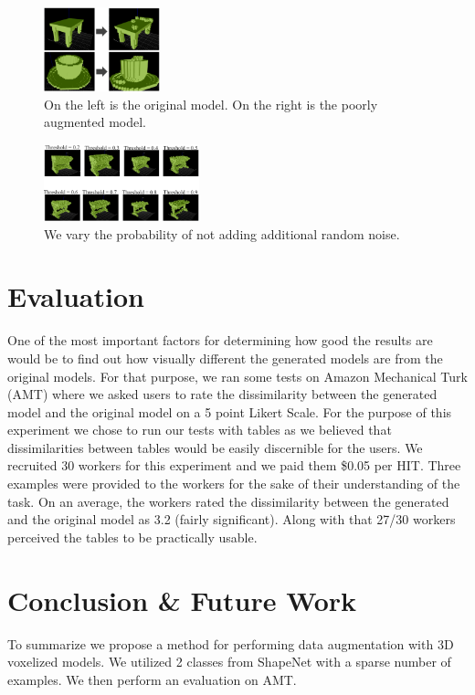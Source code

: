 \documentclass{sigchi}
\begin{document}
\begin{figure}
\includegraphics[width=0.3\textwidth]{figs/bad_results.png}
\centering
\caption{On the left is the original model. On the right is the poorly augmented model.}
\label{fig:bad_results}
\end{figure}

\begin{figure}
\includegraphics[width=0.4\textwidth]{figs/table_random.png}
\centering
\caption{We vary the probability of not adding additional random noise.}
\label{fig:table_random}
\end{figure}

\section{Evaluation}

One of the most important factors for determining how good the results are would be to find out how visually different the generated models are from the original models. For that purpose, we ran some tests on Amazon Mechanical Turk (AMT) where we asked users to rate the dissimilarity between the generated model and the original model on a 5 point Likert Scale. For the purpose of this experiment we chose to run our tests with tables as we believed that dissimilarities between tables would be easily discernible for the users. 
We recruited 30 workers for this experiment and we paid them \$0.05 per HIT. Three examples were provided to the workers for the sake of their understanding of the task. 
On an average, the workers rated the dissimilarity between the generated and the original model as 3.2 (fairly significant). Along with that 27/30 workers perceived the tables to be practically usable. 



\section{Conclusion \& Future Work}
To summarize we propose a method for performing data augmentation with 3D voxelized models. We utilized 2 classes from ShapeNet with a sparse number of examples. We then perform an evaluation on AMT.
\end{document}
